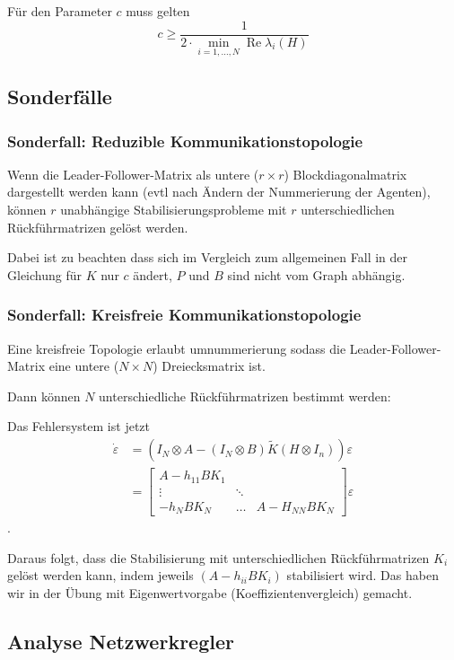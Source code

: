 Für den Parameter $c$ muss gelten
\begin{equation}
    c \geq \frac{1}{2 \cdot \min_{i=1,\ldots,N} \operatorname{Re} \lambda_i(H)}
\end{equation}

\subsection{Sonderfälle}
\subsubsection{Sonderfall: Reduzible Kommunikationstopologie}
Wenn die Leader-Follower-Matrix als untere ($r\times r$) Blockdiagonalmatrix
dargestellt werden kann (evtl nach Ändern der Nummerierung der Agenten),
können $r$ unabhängige Stabilisierungsprobleme mit $r$ unterschiedlichen
Rückführmatrizen gelöst werden.

Dabei ist zu beachten dass sich im Vergleich zum allgemeinen Fall in der
Gleichung für $K$ nur $c$ ändert, $P$ und $B$ sind nicht vom Graph abhängig.

\subsubsection{Sonderfall: Kreisfreie Kommunikationstopologie}
Eine kreisfreie Topologie erlaubt umnummerierung sodass die
Leader-Follower-Matrix eine untere ($N\times N$) Dreiecksmatrix ist.

Dann können $N$ unterschiedliche Rückführmatrizen bestimmt werden:

Das Fehlersystem ist jetzt
\begin{align}
    \dot{\varepsilon} &= (I_N \otimes A - (I_N \otimes B)\tilde{K}(H \otimes I_n))\varepsilon \\
    &= \begin{bmatrix}
        A-h_{11}BK_1 & & \\
        \vdots & \ddots & \\
        -h_N B K_N & \dots & A-H_{NN} BK_N
    \end{bmatrix} \varepsilon
\end{align}.

Daraus folgt, dass die Stabilisierung mit unterschiedlichen Rückführmatrizen $K_i$
gelöst werden kann, indem jeweils $(A-h_{ii}BK_i)$ stabilisiert wird.
Das haben wir in der Übung mit Eigenwertvorgabe (Koeffizientenvergleich) gemacht.

\subsection{Analyse Netzwerkregler}

